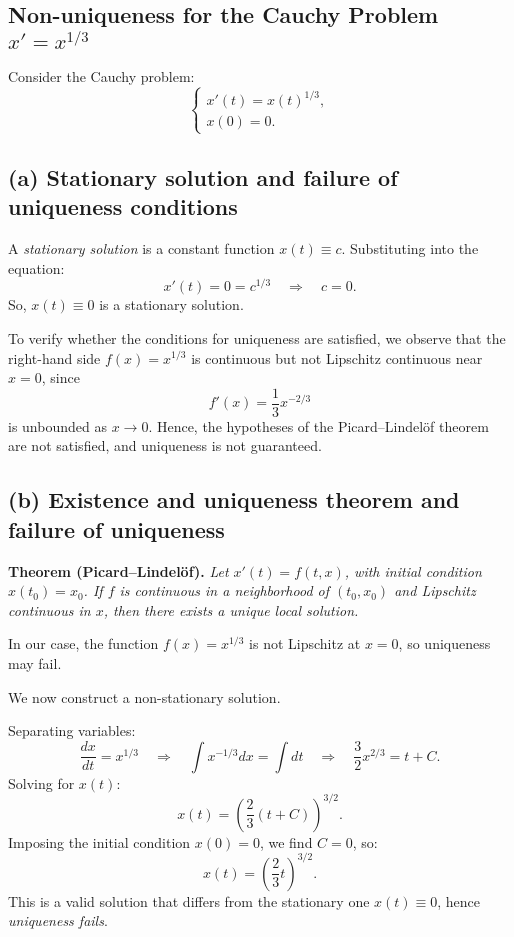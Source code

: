 
\subsection{Non-uniqueness for the Cauchy Problem \( x' = x^{1/3} \)}

Consider the Cauchy problem:
\[
\begin{cases}
x'(t) = x(t)^{1/3}, \\
x(0) = 0.
\end{cases}
\]

\subsection*{(a) Stationary solution and failure of uniqueness conditions}

A \emph{stationary solution} is a constant function \( x(t) \equiv c \). Substituting into the equation:
\[
x'(t) = 0 = c^{1/3} \quad \Rightarrow \quad c = 0.
\]
So, \( x(t) \equiv 0 \) is a stationary solution.

To verify whether the conditions for uniqueness are satisfied, we observe that the right-hand side \( f(x) = x^{1/3} \) is continuous but not Lipschitz continuous near \( x = 0 \), since
\[
f'(x) = \frac{1}{3}x^{-2/3}
\]
is unbounded as \( x \to 0 \). Hence, the hypotheses of the Picard--Lindelöf theorem are not satisfied, and uniqueness is not guaranteed.

\subsection*{(b) Existence and uniqueness theorem and failure of uniqueness}

\textbf{Theorem (Picard--Lindelöf).} \emph{Let \( x'(t) = f(t,x) \), with initial condition \( x(t_0) = x_0 \). If \( f \) is continuous in a neighborhood of \( (t_0, x_0) \) and Lipschitz continuous in \( x \), then there exists a unique local solution.}

In our case, the function \( f(x) = x^{1/3} \) is not Lipschitz at \( x = 0 \), so uniqueness may fail.

We now construct a non-stationary solution.

Separating variables:
\[
\frac{dx}{dt} = x^{1/3} \quad \Rightarrow \quad \int x^{-1/3} dx = \int dt \quad \Rightarrow \quad \frac{3}{2} x^{2/3} = t + C.
\]
Solving for \( x(t) \):
\[
x(t) = \left( \frac{2}{3}(t + C) \right)^{3/2}.
\]
Imposing the initial condition \( x(0) = 0 \), we find \( C = 0 \), so:
\[
x(t) = \left( \frac{2}{3} t \right)^{3/2}.
\]
This is a valid solution that differs from the stationary one \( x(t) \equiv 0 \), hence \emph{uniqueness fails}.

